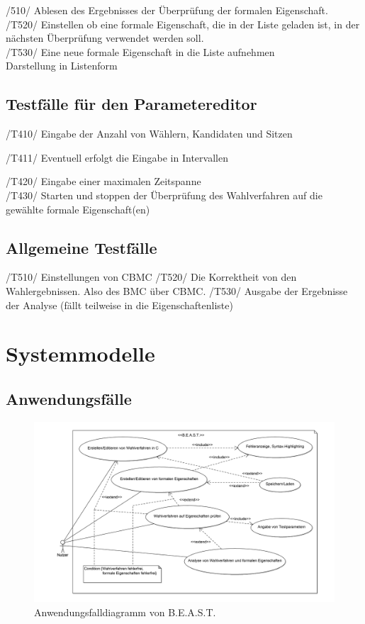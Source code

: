 \documentclass[a4paper]{scrreprt}
\begin{document}
/510/ Ablesen des Ergebnisses der Überprüfung der formalen Eigenschaft. \\
/T520/ Einstellen ob eine formale Eigenschaft, die in der Liste geladen ist, in der \\ nächsten Überprüfung verwendet werden soll. \\
/T530/ Eine neue formale Eigenschaft in die Liste aufnehmen \\
Darstellung in Listenform


\section{Testfälle für den Parametereditor}

/T410/ Eingabe der Anzahl von Wählern, Kandidaten und Sitzen
\begin{addmargin}[25pt]{0pt}
/T411/ Eventuell erfolgt die Eingabe in Intervallen
\end{addmargin}	
/T420/ Eingabe einer maximalen Zeitspanne \\
/T430/ Starten und stoppen der Überprüfung des Wahlverfahren auf die gewählte formale Eigenschaft(en) \\

\section{Allgemeine Testfälle}
/T510/ Einstellungen von CBMC
/T520/ Die Korrektheit von den Wahlergebnissen. Also des BMC über CBMC.
/T530/ Ausgabe der Ergebnisse der Analyse (fällt teilweise in die Eigenschaftenliste)

\chapter{Systemmodelle}

\section{Anwendungsfälle}

\begin{figure}[H]
\hspace{-3cm}
\includegraphics[scale=0.12]{UseCaseDiagram.png}
\caption{Anwendungsfalldiagramm von B.E.A.S.T.}
\label{Packet-scetch}
\end{figure}
\end{document}
